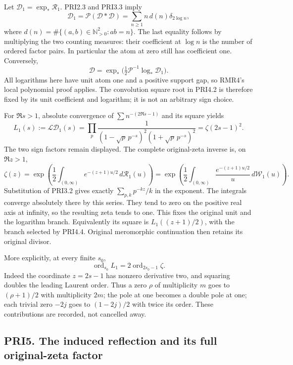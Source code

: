 \documentclass[
]{article}
\begin{document}
Let \(\mathcal D_1=\exp_*\mathcal R_1\). PRI2.3 and PRI3.3 imply \[
\mathcal D_1=\mathscr P(\mathcal D*\mathcal D)
=\sum_{n\ge1}n\,d(n)\delta_{2\log n},
\tag{PRI4.1}
\] where \(d(n)=\#\{(a,b)\in\mathbb N_{>0}^2:ab=n\}\). The last equality
follows by multiplying the two counting measures: their coefficient at
\(\log n\) is the number of ordered factor pairs. In particular the atom
at zero still has coefficient one. Conversely, \[
\mathcal D=\exp_*\bigl(\tfrac12\mathscr P^{-1}\log_*\mathcal D_1\bigr).
\tag{PRI4.2}
\] All logarithms here have unit atom one and a positive support gap, so
RMR4's local polynomial proof applies. The convolution square root in
PRI4.2 is therefore fixed by its unit coefficient and logarithm; it is
not an arbitrary sign choice.

For \(\Re s>1\), absolute convergence of \(\sum n^{-(2\Re s-1)}\) and
its square yields \[
L_1(s):=\mathcal L\mathcal D_1(s)
=\prod_p\frac1{(1-\sqrt p\,p^{-s})^2(1+\sqrt p\,p^{-s})^2}
=\zeta(2s-1)^2.
\tag{PRI4.3}
\] The two sign factors remain displayed. The complete original-zeta
inverse is, on \(\Re z>1\), \[
\boxed{\zeta(z)=\exp\left(
\frac12\int_{(0,\infty)}e^{-(z+1)u/2}\,d\mathcal R_1(u)\right)
=\exp\left(
\frac12\int_{(0,\infty)}\frac{e^{-(z+1)u/2}}u\,d\mathcal W_1(u)\right).}
\tag{PRI4.4}
\] Substitution of PRI3.2 gives exactly \(\sum_{p,k}p^{-kz}/k\) in the
exponent. The integrals converge absolutely there by this series. They
tend to zero on the positive real axis at infinity, so the resulting
zeta tends to one. This fixes the original unit and the logarithm
branch. Equivalently its square is \(L_1((z+1)/2)\), with the branch
selected by PRI4.4. Original meromorphic continuation then retains its
original divisor.

More explicitly, at every finite \(s_0\), \[
\operatorname{ord}_{s_0}L_1=2\operatorname{ord}_{2s_0-1}\zeta.
\tag{PRI4.5}
\] Indeed the coordinate \(z=2s-1\) has nonzero derivative two, and
squaring doubles the leading Laurent order. Thus a zero \(\rho\) of
multiplicity \(m\) goes to \((\rho+1)/2\) with multiplicity \(2m\); the
pole at one becomes a double pole at one; each trivial zero \(-2j\) goes
to \((1-2j)/2\) with twice its order. These contributions are recorded,
not cancelled away.

\subsection{PRI5. The induced reflection and its full original-zeta
factor}\label{pri5.-the-induced-reflection-and-its-full-original-zeta-factor}
\end{document}
